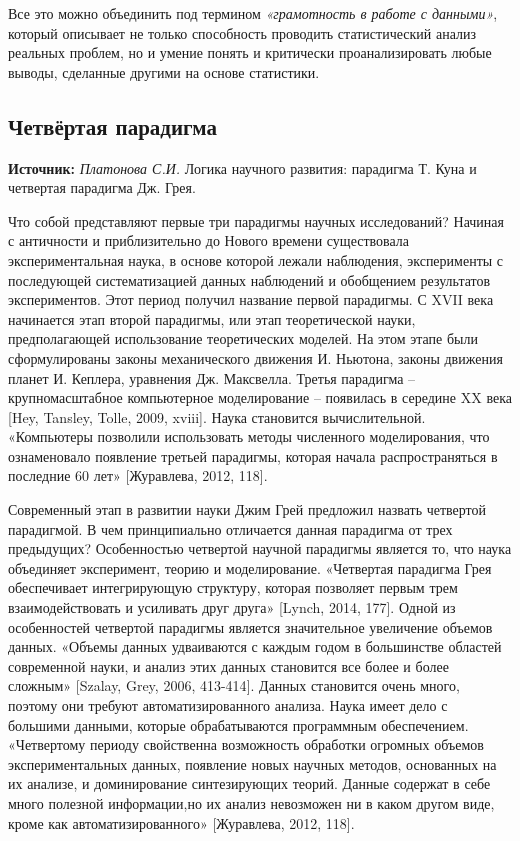 \documentclass[11pt,a4paper]{article}
\begin{document}
Все это можно объединить под термином \emph{«грамотность в работе с
данными»}, который описывает не только способность проводить
статистический анализ реальных проблем, но и умение понять и критически
проанализировать любые выводы, сделанные другими на основе статистики.

    \hypertarget{ux447ux435ux442ux432ux451ux440ux442ux430ux44f-ux43fux430ux440ux430ux434ux438ux433ux43cux430}{%
\subsection{Четвёртая
парадигма}\label{ux447ux435ux442ux432ux451ux440ux442ux430ux44f-ux43fux430ux440ux430ux434ux438ux433ux43cux430}}

\textbf{Источник:} \emph{Платонова С.И.} Логика научного развития:
парадигма Т. Куна и четвертая парадигма Дж. Грея.

Что собой представляют первые три парадигмы научных исследований?
Начиная с античности и приблизительно до Нового времени существовала
экспериментальная наука, в основе которой лежали наблюдения,
эксперименты с последующей систематизацией данных наблюдений и
обобщением результатов экспериментов. Этот период получил название
первой парадигмы. С XVII века начинается этап второй парадигмы, или этап
теоретической науки, предполагающей использование теоретических моделей.
На этом этапе были сформулированы законы механического движения И.
Ньютона, законы движения планет И. Кеплера, уравнения Дж. Максвелла.
Третья парадигма -- крупномасштабное компьютерное моделирование --
появилась в середине XX века {[}Hey, Tansley, Tolle, 2009, xviii{]}.
Наука становится вычислительной. «Компьютеры позволили использовать
методы численного моделирования, что ознаменовало появление третьей
парадигмы, которая начала распространяться в последние 60 лет»
{[}Журавлева, 2012, 118{]}.

Современный этап в развитии науки Джим Грей предложил назвать четвертой
парадигмой. В чем принципиально отличается данная парадигма от трех
предыдущих? Особенностью четвертой научной парадигмы является то, что
наука объединяет эксперимент, теорию и моделирование. «Четвертая
парадигма Грея обеспечивает интегрирующую структуру, которая позволяет
первым трем взаимодействовать и усиливать друг друга» {[}Lynch, 2014,
177{]}. Одной из особенностей четвертой парадигмы является значительное
увеличение объемов данных. «Объемы данных удваиваются с каждым годом в
большинстве областей современной науки, и анализ этих данных становится
все более и более сложным» {[}Szalay, Grey, 2006, 413-414{]}. Данных
становится очень много, поэтому они требуют автоматизированного анализа.
Наука имеет дело с большими данными, которые обрабатываются программным
обеспечением. «Четвертому периоду свойственна возможность обработки
огромных объемов экспериментальных данных, появление новых научных
методов, основанных на их анализе, и доминирование синтезирующих теорий.
Данные содержат в себе много полезной информации,но их анализ невозможен
ни в каком другом виде, кроме как автоматизированного» {[}Журавлева,
2012, 118{]}.
\end{document}
